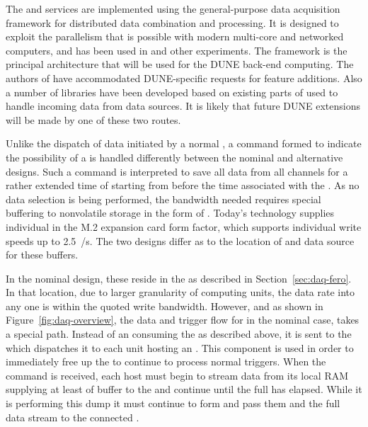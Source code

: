 The  and  services are implemented using
 the general-purpose \fnal data acquisition framework  for
distributed data combination and processing. 
It is designed to exploit the parallelism that is possible with
modern multi-core and networked computers, and has been used in  and other experiments.
The  framework is the principal architecture that will be used for the DUNE  back-end computing.
The authors of  have accommodated DUNE-specific 
requests for feature additions. Also a number of libraries have been developed based on
existing parts of  used to handle incoming data from data
sources. 
It is likely that future DUNE extensions will be made by one of these two
routes.

Unlike the dispatch of data initiated by a normal ,
a command formed to indicate the possibility of a  is
handled differently between the nominal and alternative designs. 
Such a command is interpreted to save all data from all channels
for a rather extended time of \snbtime starting from \snbpretime
before the time associated with the . 
As no data selection is being performed, the bandwidth needed requires
special buffering to nonvolatile storage in the form of . 
Today's technology supplies individual  in the M.2 expansion card form factor,
which supports individual write speeds up to \SI{2.5}{\GB/\s}. 
The two designs differ as to the location of and data source for these
buffers.

In the nominal design, these  reside in the 
as described in Section~\ref{sec:daq-fero}. 
In that location, due to larger granularity of computing units, the
data rate into any one  is within the quoted write
bandwidth. 
However, and as shown in Figure~\ref{fig:daq-overview}, the data and
trigger flow for  in the nominal case, takes a special
path. 
Instead of an  consuming the  as
described above, it is sent to the  which dispatches
it to each  unit hosting an . 
This component is used in order to immediately free up the 
to continue to process normal triggers.
When the command is received, each host must begin to stream data from
its local RAM supplying at least \snbpretime of buffer to the
 and continue until the full \snbtime has elapsed. 
While it is performing this dump it must continue to form
 and pass them and the full data stream to the
connected .

